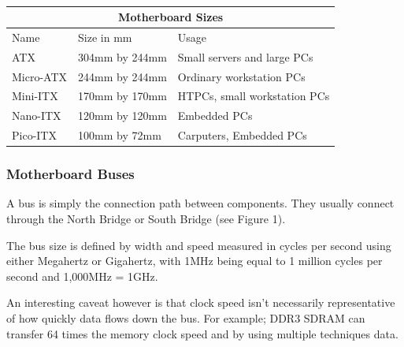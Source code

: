 \documentclass{article}
\begin{document}
\\

\begin{tabular}{ |p{3cm}||p{3cm}|p{4.8cm}|  }
 \hline
 \multicolumn{3}{|c|}{\textbf{Motherboard Sizes}} \\
 \hline
 Name & Size in mm & Usage\\
 \hline
 ATX & 304mm by 244mm & Small servers and large PCs\\
 Micro-ATX & 244mm by 244mm & Ordinary workstation PCs\\
 Mini-ITX & 170mm by 170mm & HTPCs, small workstation PCs\\
 Nano-ITX & 120mm by 120mm & Embedded PCs\\
 Pico-ITX & 100mm by 72mm & Carputers, Embedded PCs\\
 \hline
\end{tabular}

\subsubsection{Motherboard Buses}

A bus is simply the connection path between components. They usually connect through the North Bridge or South Bridge (see Figure 1).

The bus size is defined by width and speed measured in cycles per second using either Megahertz or Gigahertz, with 1MHz being equal to 1 million cycles per second and 1,000MHz = 1GHz.

An interesting caveat however is that clock speed isn't necessarily representative of how quickly data flows down the bus. For example; DDR3 SDRAM can transfer 64 times the memory clock speed and by using multiple techniques data.\\
\end{document}

